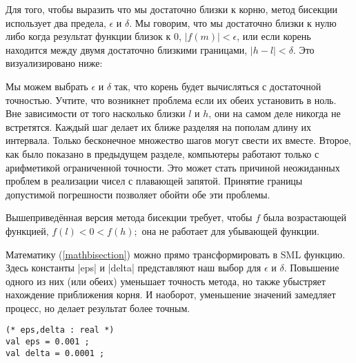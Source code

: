 Для того, чтобы выразить что мы достаточно близки к корню, метод бисекции использует два предела, $\epsilon$ и $\delta$. Мы говорим, что мы достаточно близки к нулю либо когда результат функции близок к 0, $|f(m)| < \epsilon$, или если корень находится между двумя достаточно близкими границами, $|h - l| < \delta$. Это визуализировано ниже:

\begin{center}
\end{center}

Мы можем выбрать $\epsilon$ и $\delta$ так, что корень будет вычисляться с достаточной точностью. Учтите, что возникнет проблема если их обеих установить в ноль. Вне зависимости от того насколько близки $l$ и $h$, они на самом деле никогда не встретятся. Каждый шаг делает их ближе разделяя на пополам длину их интервала. Только бесконечное множество шагов могут свести их вместе. Второе, как было показано в предыдущем разделе, компьютеры работают только с арифметикой ограниченной точности. Это может стать причиной неожиданных проблем в реализации чисел с плавающей запятой. Принятие границы допустимой погрешности позволяет обойти обе эти проблемы.

Вышеприведённая версия метода бисекции требует, чтобы $f$ была возрастающей функцией, $f(l) < 0 < f(h);$ она не работает для убывающей функции.

Математику (\ref{mathbisection}) можно прямо трансформировать в SML функцию. Здесь константы \inline|eps| и \inline|delta| представляют наш выбор для $\epsilon$ и $\delta$. Повышение одного из них (или обеих) уменьшает точность метода, но также убыстряет нахождение приближения корня. И наоборот, уменьшение значений замедляет процесс, но делает результат более точным.

\begin{lstlisting}[style=customml]
(* eps,delta : real *)
val eps = 0.001 ;
val delta = 0.0001 ;
\end{lstlisting}

